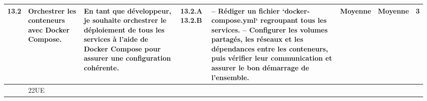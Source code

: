\begin{landscape}
\begin{spacing}{0.98}
\begin{longtable}{|p{0.6cm}|p{3cm}|p{5.2cm}|p{1cm}|p{8.2cm}|p{0.6cm}|p{0.6cm}|p{1.2cm}|}
            13.2 & Orchestrer les conteneurs avec Docker Compose.
            & En tant que développeur, je souhaite orchestrer le déploiement de tous les services à l’aide de Docker Compose pour assurer une configuration cohérente.
            & 13.2.A \newline\vspace{1cm} 13.2.B
            & 
            – Rédiger un fichier `docker-compose.yml` regroupant tous les services. \newline
            – Configurer les volumes partagés, les réseaux et les dépendances entre les conteneurs, puis vérifier leur communication et assurer le bon démarrage de l’ensemble.
            & Moyenne & Moyenne & 3 \\\hline
            
            \rowcolor{gray!20}
			\multicolumn{7}{|c|}{TOTAL} &  22UE \\
            \hline 
        \end{longtable}
    \end{spacing}
\end{landscape}